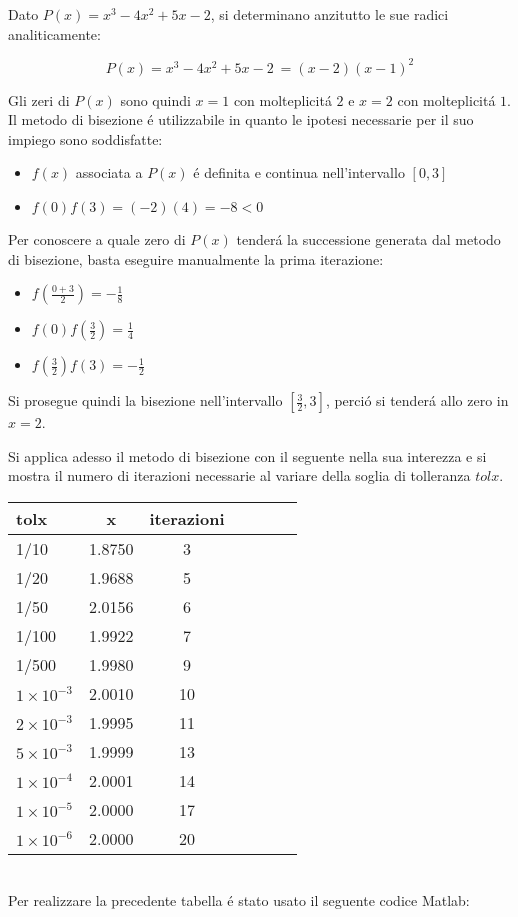 Dato \(P(x) = x^3 - 4x^2 + 5x - 2\), si determinano anzitutto le sue radici analiticamente:

\[
P(x) = x^3 - 4x^2 + 5x - 2\ = (x-2)(x-1)^2
\]

\noindent Gli zeri di \(P(x)\) sono quindi \(x=1\) con molteplicit\'a \(2\) e \(x=2\) con molteplicit\'a \(1\).\\

\noindent Il metodo di bisezione \'e utilizzabile in quanto le ipotesi necessarie per il suo impiego sono soddisfatte:

\begin{itemize}

\item \(f(x)\) associata a \(P(x)\) \'e definita e continua nell'intervallo \([0,3]\)
\item \(f(0)f(3) = (-2)(4) = -8 < 0\)

\end{itemize}

\noindent Per conoscere a quale zero di \(P(x)\) tender\'a la successione generata dal metodo di bisezione, basta eseguire manualmente la prima iterazione:

\begin{itemize}
\item \(f(\frac{0+3}{2}) = -\frac{1}{8}\)
\item \(f(0)f(\frac{3}{2}) = \frac{1}{4}\)
\item \(f(\frac{3}{2})f(3) = -\frac{1}{2}\)
\end{itemize}

\noindent Si prosegue quindi la bisezione nell'intervallo \([\frac{3}{2}, 3]\), perci\'o si tender\'a allo zero in \(x=2\).

\noindent Si applica adesso il metodo di bisezione con il seguente nella sua interezza e si mostra il numero di iterazioni necessarie al variare della soglia di tolleranza \(tolx\).\\

\begin{tabular}{l*{6}{c}}
 tolx & x & iterazioni \\
\hline
 1/10 & 1.8750 & 3 \\
 1/20 & 1.9688 & 5 \\
 1/50 & 2.0156 & 6  \\
 1/100 & 1.9922 & 7 \\
 1/500 & 1.9980 & 9 \\
 \(1 \times 10^{-3}\) & 2.0010 & 10 \\
 \(2 \times 10^{-3}\) & 1.9995 & 11 \\
 \(5 \times 10^{-3}\) & 1.9999 & 13 \\
 \(1 \times 10^{-4}\) & 2.0001 & 14 \\
 \(1 \times 10^{-5}\) & 2.0000 & 17 \\
 \(1 \times 10^{-6}\) & 2.0000 & 20 \\
\end{tabular} \\

\noindent Per realizzare la precedente tabella \'e stato usato il seguente codice Matlab:\\


